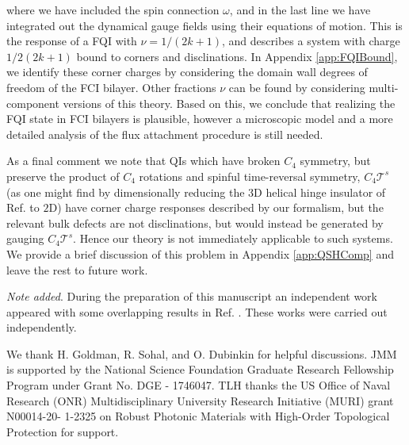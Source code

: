 \documentclass[%
 reprint,
 amsmath,amssymb,
 aps,
]{revtex4-1}
\begin{document}
where we have included the spin connection $\omega$, and in the last line we have integrated out the dynamical gauge fields using their equations of motion. This is the response of a FQI with $\nu = 1/(2k+1)$, and describes a system with charge $1/2(2k+1)$ bound to corners and disclinations. In Appendix \ref{app:FQIBound}, we identify these corner charges by considering the domain wall degrees of freedom of the FCI bilayer. Other fractions $\nu$ can be found by considering multi-component versions of this theory. Based on this, we conclude that realizing the FQI state in FCI bilayers is plausible, however a microscopic model and a more detailed analysis of the flux attachment procedure is still needed.  




As a final comment we note that QIs which have broken $C_4$ symmetry, but preserve the product of $C_4$ rotations and spinful time-reversal symmetry, $C_4\mathcal{T}^s$ (as one might find by dimensionally reducing the $3$D helical hinge insulator of Ref.  to $2$D) have corner charge responses described by our formalism, but the relevant bulk defects are not disclinations, but would instead be generated by gauging $C_4\mathcal{T}^s.$ Hence our theory is not immediately applicable to such systems. We provide a brief discussion of this problem in Appendix \ref{app:QSHComp} and leave the rest to future work. 





\begin{acknowledgements}
{\textit{Note added}}. During the preparation of this manuscript an independent work appeared with some overlapping results in Ref. . These works were carried out independently.


We thank H. Goldman, R. Sohal, and O. Dubinkin for helpful discussions. JMM is supported by the National Science Foundation Graduate Research Fellowship Program under Grant No. DGE - 1746047. TLH thanks the US Office of Naval Research (ONR) Multidisciplinary University Research Initiative (MURI) grant
N00014-20- 1-2325 on Robust Photonic Materials with
High-Order Topological Protection for support. 

\end{acknowledgements}
\end{document}
